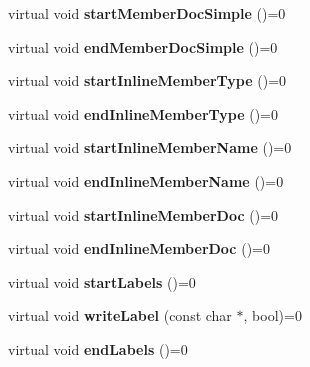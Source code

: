 \begin{DoxyCompactItemize}
\item 
\hypertarget{class_output_generator_ab4b256a08d0f8c06e25bc6aee5653694}{virtual void {\bfseries start\-Member\-Doc\-Simple} ()=0}\label{class_output_generator_ab4b256a08d0f8c06e25bc6aee5653694}

\item 
\hypertarget{class_output_generator_a77be51fbae17af8736f487b4602433b9}{virtual void {\bfseries end\-Member\-Doc\-Simple} ()=0}\label{class_output_generator_a77be51fbae17af8736f487b4602433b9}

\item 
\hypertarget{class_output_generator_a708cd1724d284b2701b380e861800d44}{virtual void {\bfseries start\-Inline\-Member\-Type} ()=0}\label{class_output_generator_a708cd1724d284b2701b380e861800d44}

\item 
\hypertarget{class_output_generator_a54866c5cebbfa44f4a5a51582dc2173b}{virtual void {\bfseries end\-Inline\-Member\-Type} ()=0}\label{class_output_generator_a54866c5cebbfa44f4a5a51582dc2173b}

\item 
\hypertarget{class_output_generator_ac676062693a39b1bedb81d1e94f286e0}{virtual void {\bfseries start\-Inline\-Member\-Name} ()=0}\label{class_output_generator_ac676062693a39b1bedb81d1e94f286e0}

\item 
\hypertarget{class_output_generator_a42116489368796033520680725833b2e}{virtual void {\bfseries end\-Inline\-Member\-Name} ()=0}\label{class_output_generator_a42116489368796033520680725833b2e}

\item 
\hypertarget{class_output_generator_a97f0b6b44ba2fce9befed89e62c73fb7}{virtual void {\bfseries start\-Inline\-Member\-Doc} ()=0}\label{class_output_generator_a97f0b6b44ba2fce9befed89e62c73fb7}

\item 
\hypertarget{class_output_generator_a27b62a8ce27b511d80b8226f2de8a08b}{virtual void {\bfseries end\-Inline\-Member\-Doc} ()=0}\label{class_output_generator_a27b62a8ce27b511d80b8226f2de8a08b}

\item 
\hypertarget{class_output_generator_ad17557822db29cbceb48a7016e181161}{virtual void {\bfseries start\-Labels} ()=0}\label{class_output_generator_ad17557822db29cbceb48a7016e181161}

\item 
\hypertarget{class_output_generator_a91552af585dcdf2032856eb1660f3049}{virtual void {\bfseries write\-Label} (const char $\ast$, bool)=0}\label{class_output_generator_a91552af585dcdf2032856eb1660f3049}

\item 
\hypertarget{class_output_generator_a4536dd84004221fa699bac8063d7454f}{virtual void {\bfseries end\-Labels} ()=0}\label{class_output_generator_a4536dd84004221fa699bac8063d7454f}

\end{DoxyCompactItemize}
